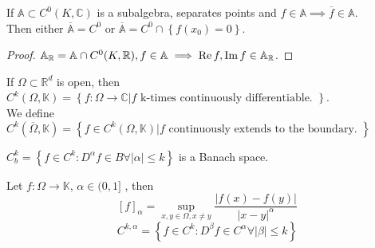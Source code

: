 \documentclass[../main.tex]{subfiles}
\begin{document}
\begin{thm}
	If $ \mathbb{A} \subset C^{0}( K, \mathbb{C}) $ is a subalgebra, separates points and $f\in \mathbb{A}\implies \overline{f} \in \mathbb{A}$.\\
	Then either $ \overline{\mathbb{A}}= C^{0}$ or $ \overline{\mathbb{A}}= C^{0}\cap \left\{ f( x_0) =0 \right\}.$ 
\end{thm}
\begin{proof}
$ \mathbb{A}_{ \mathbb{R}} = \mathbb{A}\cap C^{0}( K, \mathbb{R}), f \in \mathbb{A}\implies \operatorname{Re} f, \operatorname{Im} f \in \mathbb{A}_{ \mathbb{R}} $.
\end{proof}
\begin{defn}
If $\Omega \subset \mathbb{R}^{d}$ is open, then $C^{k}( \Omega, \mathbb{K})= \left\{ f : \Omega\to \mathbb{C}| f \text{ k-times continuously differentiable. }  \right\}  $.\\
We define $C^{k}(  \overline{\Omega}, \mathbb{K})= \left\{ f \in C^{k}( \Omega, \mathbb{K})| f \text{ continuously extends to the boundary. }   \right\}  $ 
\end{defn}
\begin{lemma}
$ C^{k}_b = \left\{ f \in C^{k}: D^{\alpha}f \in B \forall |\alpha| \leq k \right\} $ is a Banach space.
\end{lemma}
\begin{defn}
	Let $f: \Omega\to \mathbb{K}$, $\alpha \in ( 0,1] $ , then
	\[ 
		[ f]_{\alpha} = \sup _{x,y \in \Omega, x\neq y} \frac{|f( x) - f(y )| }{|x-y|^{\alpha}}
	\]
	\[ 
	C^{k,\alpha}= \left\{ f \in C^{k}: D^{\beta}f \in C^{\alpha }\forall |\beta| \leq k \right\} 
	\]
	
\end{defn}
\end{document}
